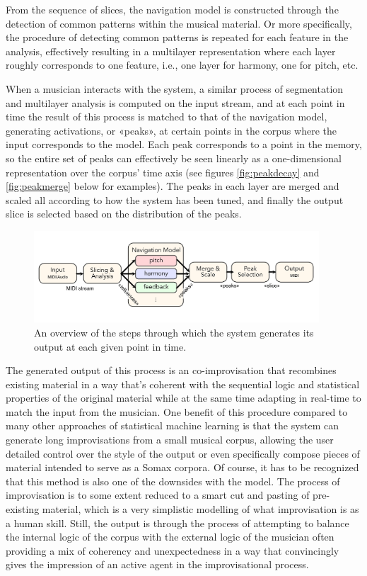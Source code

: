 From the sequence of slices, the navigation model is constructed through the detection of common patterns within the musical material. Or more specifically, the procedure of detecting common patterns is repeated for each feature in the analysis, effectively resulting in a multilayer representation where each layer roughly corresponds to one feature, i.e., one layer for harmony, one for pitch, etc. 

When a musician interacts with the system, a similar process of segmentation and multilayer analysis is computed on the input stream, and at each point in time the result of this process is matched to that of the navigation model, generating activations, or «peaks», at certain points in the corpus where the input corresponds to the model. Each peak corresponds to 
a point in the memory, so the entire set of peaks can effectively be seen linearly as a one-dimensional representation over the corpus' time axis (see figures \ref{fig:peakdecay} and \ref{fig:peakmerge}  below for examples). The peaks in each layer are merged and scaled all according to how the system has been tuned, and finally the output slice is selected based on the distribution of the peaks.

 \begin{figure}[h!]
    \centering        
 	\includegraphics[width=0.95\textwidth]{img/overview.png}
    \caption{An overview of the steps through which the system generates its output at each given point in time.}
\end{figure}

The generated output of this process is an co-improvisation that recombines existing material in a way that's coherent with the sequential logic and statistical properties of the original material while at the same time adapting in real-time to match the input from the musician. One benefit of this procedure compared to many other approaches of statistical machine learning is that the system can generate long improvisations from a small musical corpus, allowing the user detailed control over the style of the output or even specifically compose pieces of material intended to serve as a Somax corpora. Of course, it has to be recognized that this method is also one of the downsides with the model. The process of improvisation is to some extent reduced to a smart cut and pasting of pre-existing material, which is a very simplistic modelling of what improvisation is as a human skill. Still, the output is through the process of attempting to balance the internal logic of the corpus with the external logic of the musician often providing a mix of coherency and unexpectedness in a way that convincingly gives the impression of an active agent in the improvisational process.